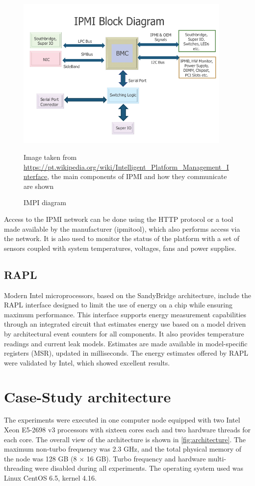 \begin{figure}[H]
\centering
\includegraphics[height = 7.5cm] {intro/figures/IPMI-Block-Diagram.png}
\caption{IMPI diagram} {Image taken from \protect \url {https://pt.wikipedia.org/wiki/Intelligent_Platform_Management_Interface}, the main components of IPMI and how they communicate are shown}
\label{fig:IPMI}
\end{figure}

Access to the IPMI network can be done using the HTTP protocol or a tool made available by the manufacturer (ipmitool), which also performs access via the network. It is also used to monitor the status of the platform with a set of sensors coupled with system temperatures, voltages, fans and power supplies.

\subsection{RAPL}

Modern Intel microprocessors, based on the SandyBridge architecture, include the RAPL \cite {Rotem2012Power-managementBridge, Hahnel2012RAPL, Hackenberg2015AnProcessor} interface designed to limit the use of energy on a chip while ensuring maximum performance. This interface supports energy measurement capabilities through an integrated circuit that estimates energy use based on a model driven by architectural event counters for all components. It also provides temperature readings and current leak models. Estimates are made available in model-specific registers (MSR), updated in milliseconds. The energy estimates offered by RAPL were validated by Intel, which showed excellent results.

\section{Case-Study architecture} \label{sec:casestudyarchitecture}
The experiments were executed in one computer node equipped with two Intel Xeon E5-2698 v3 processors with sixteen cores each and two hardware threads for each core. 
The overall view of the architecture is shown in \cref{fig:architecture}.
The maximum non-turbo frequency was 2.3 GHz, and the total physical memory of the node was 128 GB (8 $\times$ 16 GB). Turbo frequency and hardware multi-threading were disabled during all experiments. The operating system used was Linux CentOS 6.5, kernel 4.16. 

